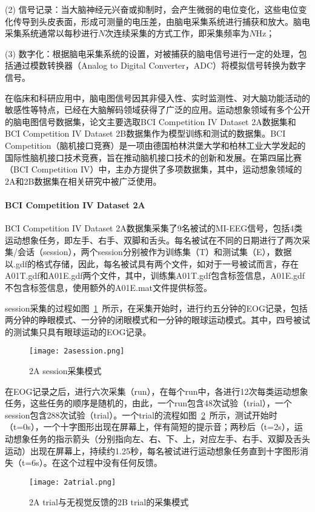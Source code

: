 (2) 信号记录：当大脑神经元兴奋或抑制时，会产生微弱的电位变化，这些电位变化传导到头皮表面，形成可测量的电压差，由脑电采集系统进行捕获和放大。脑电采集系统通常以每秒进行\(N\)次连续采集的方式工作，即采集频率为\(N\)Hz；

(3) 数字化：根据脑电采集系统的设置，对被捕获的脑电信号进行一定的处理，包括通过模数转换器（Analog to Digital Converter，ADC）将模拟信号转换为数字信号。

在临床和科研应用中，脑电图信号因其非侵入性、实时监测性、对大脑功能活动的敏感性等特点，已经在大脑解码领域获得了广泛的应用。运动想象领域有多个公开的脑电图信号数据集，论文主要选取BCI Competition IV Dataset 2A\cite{brunner2008bci}数据集和BCI Competition IV Dataset 2B\cite{leeb2008bci}数据集作为模型训练和测试的数据集。BCI Competition（脑机接口竞赛）是一项由德国柏林洪堡大学和柏林工业大学发起的国际性脑机接口技术竞赛，旨在推动脑机接口技术的创新和发展。在第四届比赛（BCI Competition IV）中，主办方提供了多项数据集，其中，运动想象领域的2A和2B数据集在相关研究中被广泛使用。

\paragraph{BCI Competition IV Dataset 2A}

BCI Competition IV Dataset 2A数据集采集了9名被试的MI-EEG信号，包括4类运动想象任务，即左手、右手、双脚和舌头。每名被试在不同的日期进行了两次采集/会话（session），两个session分别被作为训练集（T）和测试集（E），数据以.gdf的格式存储，因此，每名被试具有两个文件，如对于一号被试而言，存在A01T.gdf和A01E.gdf两个文件，其中，训练集A01T.gdf包含标签信息，A01E.gdf不包含标签信息，使用额外的A01E.mat文件提供标签。

session采集的过程如图~\ref{fig:2asession}~所示，在采集开始时，进行约五分钟的EOG记录，包括两分钟的睁眼模式、一分钟的闭眼模式和一分钟的眼球运动模式。其中，四号被试的测试集只具有眼球运动的EOG记录。
\begin{figure}
    \centering
    \texttt{[image: 2asession.png]}
    \caption{2A session采集模式\cite{brunner2008bci}}
    \label{fig:2asession}
\end{figure}

在EOG记录之后，进行六次采集（run），在每个run中，各进行12次每类运动想象任务，这些任务的顺序是随机的，由此，一个run包含48次试验（trial），一个session包含288次试验（trial）。一个trial的流程如图~\ref{fig:2atrial}~所示，测试开始时（t=0s），一个十字图形出现在屏幕上，伴有简短的提示音；两秒后（t=2s），运动想象任务的指示箭头（分别指向左、右、下、上，对应左手、右手、双脚及舌头运动）出现在屏幕上，持续约1.25秒，每名被试进行运动想象任务直到十字图形消失（t=6s）。在这个过程中没有任何反馈。
\begin{figure}
    \centering
    \texttt{[image: 2atrial.png]}
    \caption{2A trial与无视觉反馈的2B trial的采集模式\cite{brunner2008bci,leeb2008bci}}
    \label{fig:2atrial}
\end{figure}

